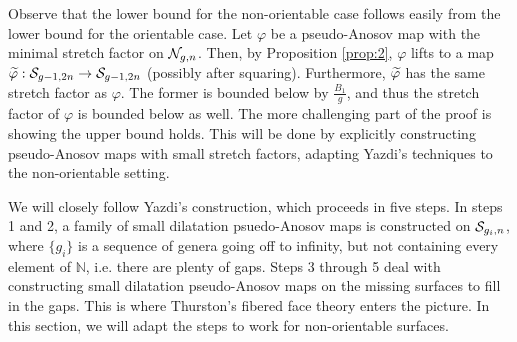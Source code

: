 
Observe that the lower bound for the non-orientable case follows easily from the lower bound for the orientable case.
Let $\varphi$ be a pseudo-Anosov map with the minimal stretch factor on $\mathcal{N}_{g,n}$. Then, by Proposition \ref{prop:2},
$\varphi$ lifts to a map $\widetilde{\varphi}:\mathcal{S}_{g-1, 2n}\to\mathcal{S}_{g-1,2n}$ (possibly after squaring). Furthermore, $\widetilde{\varphi}$ has the same
stretch factor as $\varphi$. The former is bounded below by $\frac{B_1}{g}$, and thus the stretch factor of $\varphi$ is bounded
below as well. The more challenging part of the proof is showing the upper bound holds. This will be done by explicitly
constructing pseudo-Anosov maps with small stretch factors, adapting Yazdi's techniques to the non-orientable setting.

We will closely follow Yazdi's construction, which proceeds in five steps.  In steps 1 and 2, a family of small dilatation psuedo-Anosov
maps is constructed on $\mathcal{S}_{g_i,n}$, where $\{g_i\}$ is a sequence of genera going off to infinity, but not
containing every element of $\mathbb{N}$, i.e. there are plenty of gaps. Steps 3 through 5 deal with constructing small dilatation pseudo-Anosov maps on the missing surfaces to fill in the gaps. This is where
Thurston's fibered face theory enters the picture. In this section, we will adapt the steps to work for
non-orientable surfaces.

